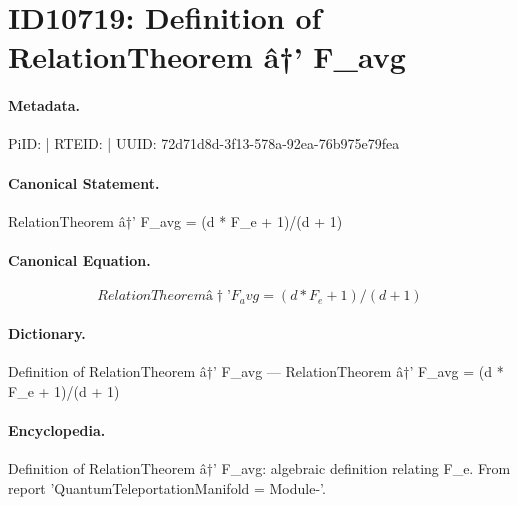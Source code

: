 \section*{ID10719: Definition of RelationTheorem â†’ F\_avg}
\paragraph{Metadata.}
PiID:  | RTEID:  | UUID: 72d71d8d-3f13-578a-92ea-76b975e79fea

\paragraph{Canonical Statement.}
RelationTheorem â†’ F\_avg = (d * F\_e + 1)/(d + 1)

\paragraph{Canonical Equation.}
\[
RelationTheorem â†’ F_avg = (d * F_e + 1)/(d + 1)
\]

\paragraph{Dictionary.}
Definition of RelationTheorem â†’ F\_avg — RelationTheorem â†’ F\_avg = (d * F\_e + 1)/(d + 1)

\paragraph{Encyclopedia.}
Definition of RelationTheorem â†’ F\_avg: algebraic definition relating F\_e. From report 'QuantumTeleportationManifold = Module-'.
